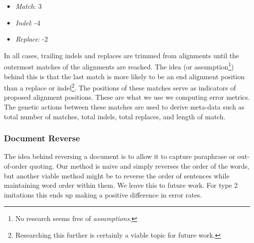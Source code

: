 	\begin{itemize}
		\item \textit{Match}: 3
		\item \textit{Indel}: -4
		\item \textit{Replace}: -2
	\end{itemize}

In all cases, trailing indels and replaces are trimmed from alignments until the outermost matches of the alignments are reached. %
The idea (or assumption\footnote{No research seems free of \textit{assumptions}.}) behind this is that the last match is more likely to be an end alignment position than a replace or indel\footnote{Researching this further is certainly a viable topic for future work.}.
The positions of these matches serve as indicators of proposed alignment positions. These are what we use we computing error metrics. The genetic actions between these matches are used to derive meta-data such as total number of matches, total indels, total replaces, and length of match.


\subsubsection{Document Reverse}
The idea behind reversing a document is to allow it to capture paraphrase or out-of-order quoting. Our method is naive and simply reverses the order of the words, but another viable method might be to reverse the order of sentences while maintaining word order within them. We leave this to future work. For type 2 imitations this ends up making a positive difference in error rates.



